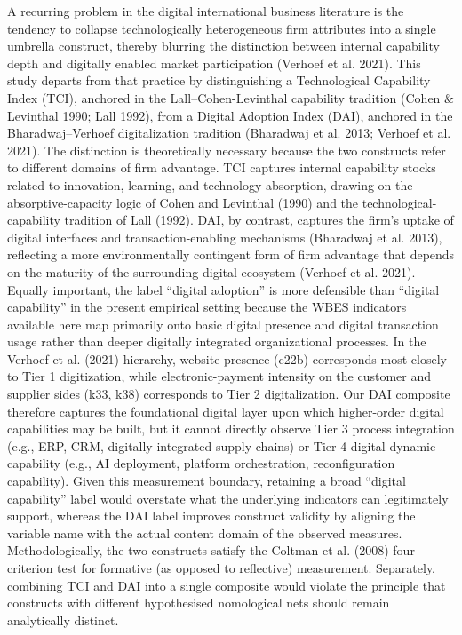 \documentclass[12pt,a4paper]{article}
\begin{document}
A recurring problem in the digital international business literature is
the tendency to collapse technologically heterogeneous firm attributes
into a single umbrella construct, thereby blurring the distinction
between internal capability depth and digitally enabled market
participation (Verhoef et al. 2021). This study departs from that
practice by distinguishing a Technological Capability Index (TCI),
anchored in the Lall--Cohen-Levinthal capability tradition (Cohen \&
Levinthal 1990; Lall 1992), from a Digital Adoption Index (DAI),
anchored in the Bharadwaj--Verhoef digitalization tradition (Bharadwaj
et al. 2013; Verhoef et al. 2021). The distinction is theoretically
necessary because the two constructs refer to different domains of firm
advantage. TCI captures internal capability stocks related to
innovation, learning, and technology absorption, drawing on the
absorptive-capacity logic of Cohen and Levinthal (1990) and the
technological-capability tradition of Lall (1992). DAI, by contrast,
captures the firm's uptake of digital interfaces and
transaction-enabling mechanisms (Bharadwaj et al. 2013), reflecting a
more environmentally contingent form of firm advantage that depends on
the maturity of the surrounding digital ecosystem (Verhoef et al. 2021).
Equally important, the label ``digital adoption'' is more defensible
than ``digital capability'' in the present empirical setting because the
WBES indicators available here map primarily onto basic digital presence
and digital transaction usage rather than deeper digitally integrated
organizational processes. In the Verhoef et al. (2021) hierarchy,
website presence (c22b) corresponds most closely to Tier 1 digitization,
while electronic-payment intensity on the customer and supplier sides
(k33, k38) corresponds to Tier 2 digitalization. Our DAI composite
therefore captures the foundational digital layer upon which
higher-order digital capabilities may be built, but it cannot directly
observe Tier 3 process integration (e.g., ERP, CRM, digitally integrated
supply chains) or Tier 4 digital dynamic capability (e.g., AI
deployment, platform orchestration, reconfiguration capability). Given
this measurement boundary, retaining a broad ``digital capability''
label would overstate what the underlying indicators can legitimately
support, whereas the DAI label improves construct validity by aligning
the variable name with the actual content domain of the observed
measures. Methodologically, the two constructs satisfy the Coltman et
al. (2008) four-criterion test for formative (as opposed to reflective)
measurement. Separately, combining TCI and DAI into a single composite
would violate the principle that constructs with different hypothesised
nomological nets should remain analytically distinct.
\end{document}
